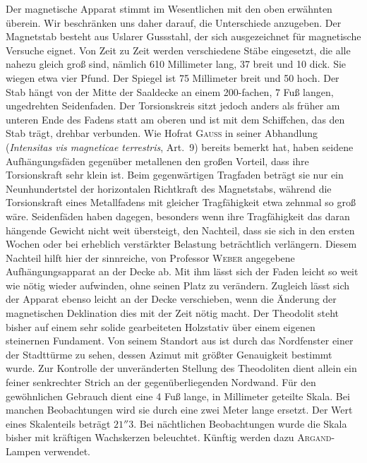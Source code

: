 Der magnetische Apparat stimmt im Wesentlichen mit den oben erwähnten überein. Wir beschränken uns daher darauf, die Unterschiede anzugeben. Der Magnetstab besteht aus Uslarer Gussstahl, der sich ausgezeichnet für magnetische Versuche eignet. Von Zeit zu Zeit werden verschiedene Stäbe eingesetzt, die alle nahezu gleich groß sind, nämlich 610 Millimeter lang, 37 breit und 10 dick. Sie wiegen etwa vier Pfund. Der Spiegel ist 75 Millimeter breit und 50 hoch. Der Stab hängt von der Mitte der Saaldecke an einem 200-fachen, 7 Fuß langen, ungedrehten Seidenfaden. Der Torsionskreis sitzt jedoch anders als früher am unteren Ende des Fadens statt am oberen und ist mit dem Schiffchen, das den Stab trägt, drehbar verbunden. Wie Hofrat \textsc{Gauss} in seiner Abhandlung (\textit{Intensitas vis magneticae terrestris}, Art.\ 9) bereits bemerkt hat, haben seidene Aufhängungsfäden gegenüber metallenen den großen Vorteil, dass ihre Torsionskraft sehr klein ist. Beim gegenwärtigen Tragfaden beträgt sie nur ein Neunhundertstel der horizontalen Richtkraft des Magnetstabs, während die Torsionskraft eines Metallfadens mit gleicher Tragfähigkeit etwa zehnmal so groß wäre. Seidenfäden haben dagegen, besonders wenn ihre Tragfähigkeit das daran hängende Gewicht nicht weit übersteigt, den Nachteil, dass sie sich in den ersten Wochen oder bei erheblich verstärkter Belastung beträchtlich verlängern. Diesem Nachteil hilft hier der sinnreiche, von Professor \textsc{Weber} angegebene Aufhängungsapparat an der Decke ab. Mit ihm lässt sich der Faden leicht so weit wie nötig wieder aufwinden, ohne seinen Platz zu verändern. Zugleich lässt sich der Apparat ebenso leicht an der Decke verschieben, wenn die Änderung der magnetischen Deklination dies mit der Zeit nötig macht. Der Theodolit steht bisher auf einem sehr solide gearbeiteten Holzstativ über einem eigenen steinernen Fundament. Von seinem Standort aus ist durch das Nordfenster einer der Stadttürme zu sehen, dessen Azimut mit größter Genauigkeit bestimmt wurde. Zur Kontrolle der unveränderten Stellung des Theodoliten dient allein ein feiner senkrechter Strich an der gegenüberliegenden Nordwand. Für den gewöhnlichen Gebrauch dient eine 4 Fuß lange, in Millimeter geteilte Skala. Bei manchen Beobachtungen wird sie durch eine zwei Meter lange ersetzt. Der Wert eines Skalenteils beträgt $21''3$. Bei nächtlichen Beobachtungen wurde die Skala bisher mit kräftigen Wachskerzen beleuchtet. Künftig werden dazu \textsc{Argand}-Lampen verwendet.

